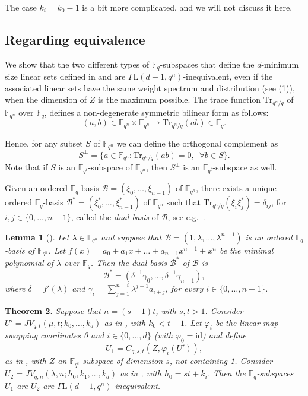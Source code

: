 \documentclass[11pt]{article}
\newtheorem{theorem}{Theorem}[section]
\newtheorem{lemma}[theorem]{Lemma}
\theoremstyle{definition}
\newcommand{\fqn}{\mathbb{F}_{q^n}}
\newcommand{\F}{{\mathbb F}}
\newcommand{\fq}{{\mathbb F}_{q}}
\begin{document}
The case $k_i = k_0 - 1$ is a bit more complicated, and we will not discuss it here.


\subsection{Regarding equivalence}

We show that the two different types of $\fq$-subspaces that define the $d$-minimum size linear sets defined in  and  are $\Gamma\mathrm{L}(d+1,q^n)$-inequivalent, even if the associated linear sets have the same weight spectrum and distribution (see  (1)), when the dimension of $Z$ is the maximum possible.
The trace function $\mathrm{Tr}_{q^n/q}$ of $\fqn$ over $\fq$, defines a non-degenerate symmetric bilinear form as follows:
\[
(a,b) \in \F_{q^n} \times \F_{q^n} \mapsto \mathrm{Tr}_{q^n/q}(ab) \in \F_q.
\]

Hence, for any subset $S$ of $\fqn$ we can define the orthogonal complement as
\[ 
 S^\perp=\{a \in \fqn \colon \mathrm{Tr}_{q^n/q}(ab)=0,\,\,\,\forall b \in S \}. 
\]
Note that if $S$ is an $\F_{q^t}$-subspace of $\F_{q^n}$, then $S^{\perp}$ is an $\F_{q^t}$-subspace as well.

Given an ordered $\F_{q}$-basis $\mathcal{B}=(\xi_0,\ldots,\xi_{n-1})$ of $\F_{q^n}$, there exists a unique ordered $\fq$-basis $\mathcal{B}^*=(\xi_0^*,\ldots,\xi_{n-1}^*)$ of $\F_{q^n}$ such that $\mathrm{Tr}_{q^n/q}(\xi_i \xi_j^*)= \delta_{ij}$, for $i,j\in\{0,\ldots,n-1\}$, called the \emph{dual basis} of $\mathcal B$, see e.g.\ \cite[Definition 2.30]{lidl1997finite}. 

\begin{lemma}[{\cite[Corollary 2.7]{napolitano2022linearsets}}]
\label{cor:dualbasis}
Let $\lambda \in \fqn$ and suppose that $\mathcal{B}=(1,\lambda,\ldots,\lambda^{n-1})$ is an ordered $\fq$-basis of $\fqn$.
Let $f(x)=a_0+a_1x+\ldots+a_{n-1}x^{n-1}+x^n$ be the minimal polynomial of $\lambda$ over $\fq$. 
Then the dual basis $\mathcal{B}^*$ of $\mathcal{B}$ is 
\[ \mathcal{B}^*=(\delta^{-1}\gamma_0,\ldots,\delta^{-1}\gamma_{n-1}), \]
where $\delta=f'(\lambda)$ and $\gamma_i=\sum_{j=1}^{n-i} \lambda^{j-1}a_{i+j}$, for every $i \in \{0,\ldots,n-1\}$. 
\end{lemma}

\begin{theorem} \label{th:equivalenceminimumsize}
Suppose that $n =(s+1) t$, with $s,t>1$. Consider $U' = JV_{q,t}(\mu,t;k_0, \dots, k_d)$ as in , with $k_0<t-1$. Let $\varphi_i$ be the linear map swapping coordinates 0 and $i \in \{0,\dots,d\}$ (with  $\varphi_0 = \mathrm{id}$) and
define
\[
 U_1 = C_{q,s,t}(Z,\varphi_i(U')),
\]
 as in ,
with $Z$ an $\F_{q^t}$-subspace of dimension $s$, not containing 1. 
Consider $U_2 = JV_{q,n}(\lambda,n;h_0, k_1, \dots, k_d)$ as in , 
with $h_0=st+k_i$. 
Then the $\fq$-subspaces $U_1$ are $U_2$ are $\Gamma\mathrm{L}(d+1,q^n)$-inequivalent.
\end{theorem}
\end{document}
